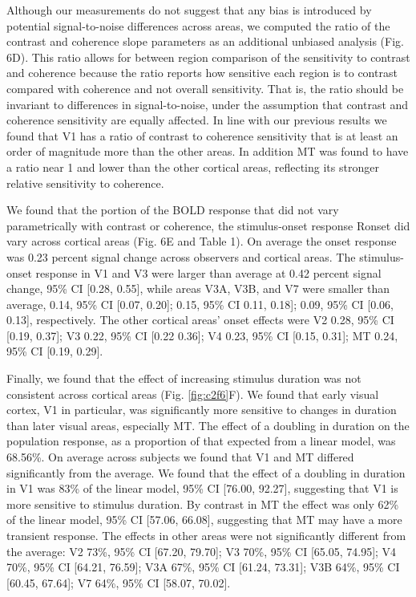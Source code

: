 Although our measurements do not suggest that any bias is introduced by potential signal-to-noise differences across areas, we computed the ratio of the contrast and coherence slope parameters as an additional unbiased analysis (Fig. 6D). This ratio allows for between region comparison of the sensitivity to contrast and coherence because the ratio reports how sensitive each region is to contrast compared with coherence and not overall sensitivity. That is, the ratio should be invariant to differences in signal-to-noise, under the assumption that contrast and coherence sensitivity are equally affected. In line with our previous results we found that V1 has a ratio of contrast to coherence sensitivity that is at least an order of magnitude more than the other areas. In addition MT was found to have a ratio near 1 and lower than the other cortical areas, reflecting its stronger relative sensitivity to coherence.

We found that the portion of the BOLD response that did not vary parametrically with contrast or coherence, the stimulus-onset response Ronset did vary across cortical areas (Fig. 6E and Table 1). On average the onset response was 0.23 percent signal change across observers and cortical areas. The stimulus-onset response in V1 and V3 were larger than average at 0.42 percent signal change, 95\% CI [0.28, 0.55], while areas V3A, V3B, and V7 were smaller than average, 0.14, 95\% CI [0.07, 0.20]; 0.15, 95\% CI 0.11, 0.18]; 0.09, 95\% CI [0.06, 0.13], respectively. The other cortical areas’ onset effects were V2 0.28, 95\% CI [0.19, 0.37]; V3 0.22, 95\% CI [0.22 0.36]; V4 0.23, 95\% CI [0.15, 0.31]; MT 0.24, 95\% CI [0.19, 0.29].

Finally, we found that the effect of increasing stimulus duration was not consistent across cortical areas (Fig. \ref{fig:c2f6}F). We found that early visual cortex, V1 in particular, was significantly more sensitive to changes in duration than later visual areas, especially MT. The effect of a doubling in duration on the population response, as a proportion of that expected from a linear model, was 68.56\%. On average across subjects we found that V1 and MT differed significantly from the average. We found that the effect of a doubling in duration in V1 was 83\% of the linear model, 95\% CI [76.00, 92.27], suggesting that V1 is more sensitive to stimulus duration. By contrast in MT the effect was only 62\% of the linear model, 95\% CI [57.06, 66.08], suggesting that MT may have a more transient response. The effects in other areas were not significantly different from the average: V2 73\%, 95\% CI [67.20, 79.70]; V3 70\%, 95\% CI [65.05, 74.95]; V4 70\%, 95\% CI [64.21, 76.59]; V3A 67\%, 95\% CI [61.24, 73.31]; V3B 64\%, 95\% CI [60.45, 67.64]; V7 64\%, 95\% CI [58.07, 70.02].


